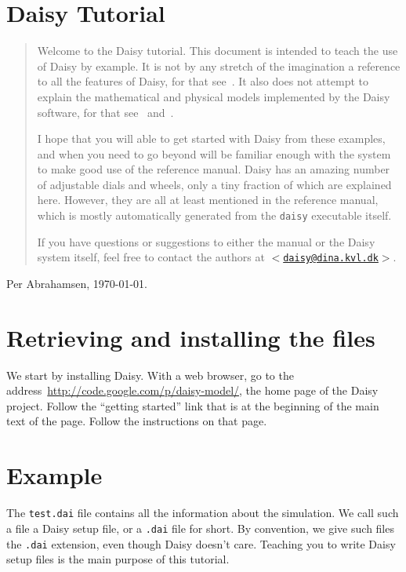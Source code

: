\documentclass[a4paper]{article}
\begin{document}
\sloppy

\section*{Daisy Tutorial}

\begin{abstract}
  Welcome to the Daisy tutorial.  This document is intended to
  teach the use of Daisy by example.  It is not by any stretch of
  the imagination a reference to all the features of Daisy, for
  that see~\cite{dina81}.  It also does not attempt to explain the
  mathematical and physical models implemented by the Daisy
  software, for that see~\cite{daisy-def} and~\cite{daisy-new}.
  
  I hope that you will able to get started with Daisy from these
  examples, and when you need to go beyond will be familiar enough
  with the system to make good use of the reference manual.  Daisy
  has an amazing number of adjustable dials and wheels, only a tiny
  fraction of which are explained here.  However, they are all at
  least mentioned in the reference manual, which is mostly
  automatically generated from the \texttt{daisy} executable itself.
  
  If you have questions or suggestions to either the manual or the
  Daisy system itself, feel free to contact the authors at
  \href{mailto:daisy@dina.kvl.dk}{\texttt{$<$daisy@dina.kvl.dk$>$}}.
\end{abstract}

Per Abrahamsen, \today{}.

\tableofcontents

\section{Retrieving and installing the files}
\label{sec:install}

We start by installing Daisy.  With a web browser, go to the
address~\url{http://code.google.com/p/daisy-model/}, the home page of
the Daisy project.  Follow the ``getting started'' link that is at
the beginning of the main text of the page.  Follow the instructions
on that page.

\section{Example}

The \texttt{test.dai} file contains all the information about the
simulation.  We call such a file a Daisy setup file, or a
\texttt{.dai} file for short.  By convention, we give such files the
\texttt{.dai} extension, even though Daisy doesn't care.  Teaching
you to write Daisy setup files is the main purpose of this
tutorial.
\end{document}
